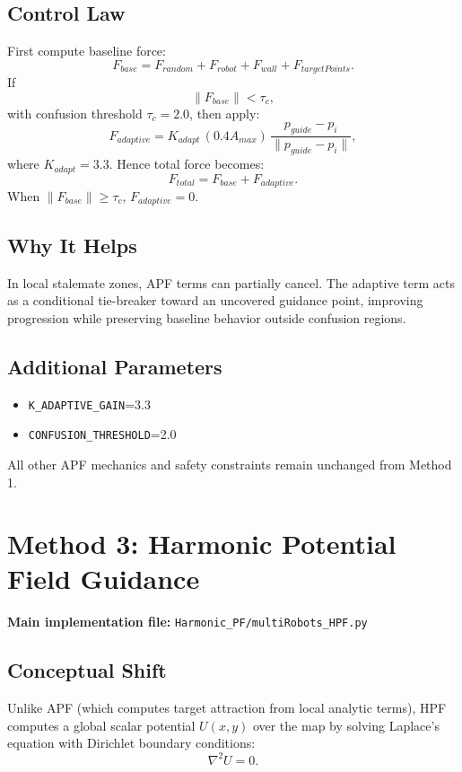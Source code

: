 \documentclass[11pt,a4paper]{article}
\begin{document}
\subsection{Control Law}
First compute baseline force:
\begin{equation}
    F_{base}=F_{random}+F_{robot}+F_{wall}+F_{targetPoints}.
\end{equation}
If
\begin{equation}
    \|F_{base}\|<\tau_c,
\end{equation}
with confusion threshold $\tau_c=2.0$, then apply:
\begin{equation}
    F_{adaptive}=K_{adapt}\,(0.4A_{max})\,\frac{p_{guide}-p_i}{\|p_{guide}-p_i\|},
\end{equation}
where $K_{adapt}=3.3$.
Hence total force becomes:
\begin{equation}
    F_{total}=F_{base}+F_{adaptive}.
\end{equation}
When $\|F_{base}\|\ge\tau_c$, $F_{adaptive}=0$.

\subsection{Why It Helps}
In local stalemate zones, APF terms can partially cancel. The adaptive term acts as a conditional tie-breaker toward an uncovered guidance point, improving progression while preserving baseline behavior outside confusion regions.

\subsection{Additional Parameters}
\begin{itemize}[leftmargin=1.2em]
    \item \texttt{K\_ADAPTIVE\_GAIN}=3.3
    \item \texttt{CONFUSION\_THRESHOLD}=2.0
\end{itemize}
All other APF mechanics and safety constraints remain unchanged from Method 1.

\section{Method 3: Harmonic Potential Field Guidance}
\textbf{Main implementation file:} \texttt{Harmonic\_PF/multiRobots\_HPF.py}

\subsection{Conceptual Shift}
Unlike APF (which computes target attraction from local analytic terms), HPF computes a global scalar potential $U(x,y)$ over the map by solving Laplace's equation with Dirichlet boundary conditions:
\begin{equation}
    \nabla^2 U = 0.
\end{equation}
\end{document}
